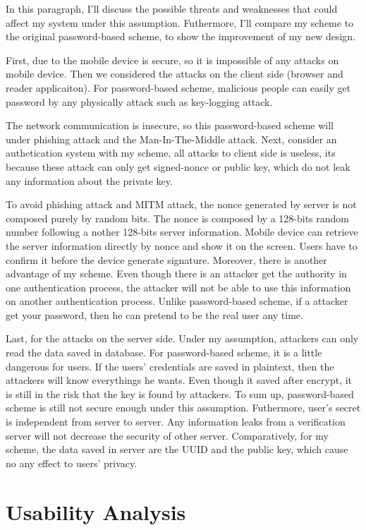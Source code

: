 \begin{CJK}{Bg5}{bsmi}
In this paragraph, I'll discuss the possible threats and weaknesses that could affect my system under this assumption. Futhermore, I'll compare my scheme to the original password-based scheme, to show the improvement of my new design.

First, due to the mobile device is secure, so it is impossible of any attacks on mobile device. Then we considered the attacks on the client side (browser and reader applicaiton). For password-based scheme, malicious people can easily get password by any physically attack such as key-logging attack. 

The network communication is insecure, so this password-based scheme will under phishing attack and the Man-In-The-Middle attack. Next, consider an authetication system with my scheme, all attacks to client side is useless, its because these attack can only get signed-nonce or public key, which do not leak any information about the private key. 

To avoid phishing attack and MITM attack, the nonce generated by server is not composed purely by random bits. The nonce is composed by a 128-bits random number following a nother 128-bits server information. Mobile device can retrieve the server information directly by nonce and show it on the screen. Users have to confirm it before the device generate signature. Moreover, there is another advantage of my scheme. Even though there is an attacker get the authority in one authentication process, the attacker will not be able to use this information on another authentication process. Unlike password-based scheme, if a attacker get your password, then he can pretend to be the real user any time.

Last, for the attacks on the server side. Under my assumption, attackers can only read the data saved in database. For password-based scheme, it is a little dangerous for users. If the users' credentials are saved in plaintext, then the attackers will know everythings he wants. Even though it saved after encrypt, it is still in the risk that the key is found by attackers. To sum up, password-based scheme is still not secure enough under this assumption. Futhermore, user's secret is independent from server to server. Any information leaks from a verification server will not decrease the security of other server. Comparatively, for my scheme, the data saved in server are the UUID and the public key, which cause no any effect to users' privacy.

\section{Usability Analysis}


\end{CJK}
